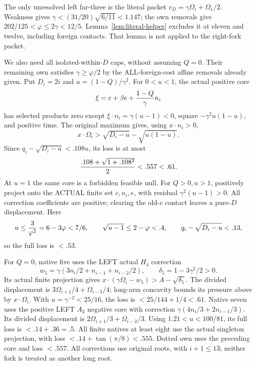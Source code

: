 The only unresolved left far-three is the literal packet
\(v_D=\gamma\Omega_i+\Omega_1/2\).
Weakness gives \(\gamma<(31/20)\sqrt{6/11}<1.147\);
the own removals give
\(202/125<\varphi\le2\gamma<12/5\).
Lemma~\ref{lem:literal-helper} excludes it at eleven
and twelve, including foreign contacts.
That lemma is not applied to the right-fork packet.

We also need all isolated-within-\(D\) caps, without
assuming \(Q=0\).
Their remaining own satisfies \(\gamma\ge\varphi/2\)
by the ALL-foreign-cost affine removals already given.
Put \(D_i=2i\) and \(u=(1-Q)/\gamma^2\).
For \(0<u<1\), the actual positive core
\[
 \xi=c+\beta e+{1-Q\over\gamma}n_i
\]
has selected products zero except
\(\xi\cdot n_i=\gamma(u-1)<0\), square
\(-\gamma^2u(1-u)\), and positive time.
The original maximum gives, using \(x\cdot n_i>0\),
\[
 x\cdot\Omega_i>
       \sqrt{D_i-u}-\sqrt{u(1-u)} .
\]
Since \(q_i-\sqrt{D_i-u}<.108u\), its loss is at most
\[
                {.108+\sqrt{1+.108^2}\over2}<.557<.61 .
\]
At \(u=1\) the same core is a forbidden feasible null.
For \(Q>0,u>1\), positively project onto the ACTUAL
finite set \(c,n_i,e\), with residual
\(\gamma^2(u-1)>0\).
All correction coefficients are positive; clearing the
old-\(e\) contact leaves a pure-\(D\) displacement.
Here
\[
 u\le{3\over\varphi^2}=6-3\varphi<7/6,\qquad
 \sqrt{u-1}\le2-\varphi<.4,\qquad
 q_i-\sqrt{D_i-u}<.13 ,
\]
so the full loss is \(<.53\).

For \(Q=0\), native five uses the LEFT actual \(H_4\)
correction
\[
 w_5=\gamma(3n_i/2+n_{i-1}+n_{i-2}/2),\qquad
 \delta_5=1-3\gamma^2/2>0 .
\]
Its actual finite projection gives
\(x\cdot(\gamma\Omega_i-w_5)>A-\sqrt{\delta_5}\).
The divided displacement is
\(3\Omega_{i+1}/4+\Omega_{i-3}/4\);
long-arm concavity bounds its pressure above by
\(x\cdot\Omega_i\).
With \(u=\gamma^{-2}<25/16\), the loss is
\(<25/144+1/4<.61\).
Native seven uses the positive LEFT \(A_2\) negative
core with correction
\(\gamma(4n_i/3+2n_{i-1}/3)\).
Its divided displacement is
\(2\Omega_{i+1}/3+\Omega_{i-2}/3\).
Using \(1.21<u<100/81\), its full loss is
\(<.14+.36=.5\).
All finite natives at least eight use the actual singleton
projection, with loss
\(<.14+\tan(\pi/8)<.555\).
Dotted own uses the preceding core and loss \(<.557\).
All corrections use original roots, with \(i+1\le13\);
neither fork is treated as another long root.

